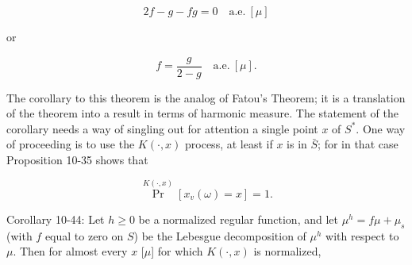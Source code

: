 $$2f - g - fg = 0 \quad \text{a.e.} \ [\mu]$$

or

$$f = \frac{g}{2 - g} \quad \text{a.e.} \ [\mu].$$

The corollary to this theorem is the analog of Fatou’s Theorem; it is a translation of the theorem into a result in terms of harmonic measure. The statement of the corollary needs a way of singling out for attention a single point $x$ of $S^*$. One way of proceeding is to use the $K(\cdot, x)$ process, at least if $x$ is in $\bar{S}$; for in that case Proposition 10-35 shows that

$$\Pr^{K(\cdot, x)}[x_v(\omega) = x] = 1.$$

Corollary 10-44: Let $h \geq 0$ be a normalized regular function, and let $\mu^h = f\mu + \mu_s$ (with $f$ equal to zero on $S$) be the Lebesgue decomposition of $\mu^h$ with respect to $\mu$. Then for almost every $x$ [$\mu$] for which $K(\cdot, x)$ is normalized,
